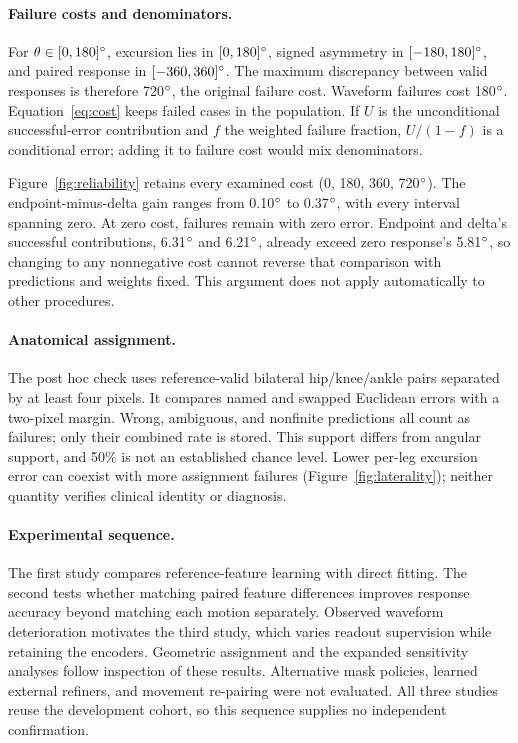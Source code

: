 \paragraph{Failure costs and denominators.} For $\theta\in[0,180]^{\circ}$, excursion lies in $[0,180]^{\circ}$, signed asymmetry in $[-180,180]^{\circ}$, and paired response in $[-360,360]^{\circ}$. The maximum discrepancy between valid responses is therefore 720$^{\circ}$, the original failure cost. Waveform failures cost 180$^{\circ}$. Equation~\ref{eq:cost} keeps failed cases in the population. If $U$ is the unconditional successful-error contribution and $f$ the weighted failure fraction, $U/(1-f)$ is a conditional error; adding it to failure cost would mix denominators.

Figure~\ref{fig:reliability} retains every examined cost (0, 180, 360, 720$^{\circ}$). The endpoint-minus-delta gain ranges from 0.10$^{\circ}$ to 0.37$^{\circ}$, with every interval spanning zero. At zero cost, failures remain with zero error. Endpoint and delta's successful contributions, 6.31$^{\circ}$ and 6.21$^{\circ}$, already exceed zero response's 5.81$^{\circ}$, so changing to any nonnegative cost cannot reverse that comparison with predictions and weights fixed. This argument does not apply automatically to other procedures.

\paragraph{Anatomical assignment.} The post hoc check uses reference-valid bilateral hip/knee/ankle pairs separated by at least four pixels. It compares named and swapped Euclidean errors with a two-pixel margin. Wrong, ambiguous, and nonfinite predictions all count as failures; only their combined rate is stored. This support differs from angular support, and 50\% is not an established chance level. Lower per-leg excursion error can coexist with more assignment failures (Figure~\ref{fig:laterality}); neither quantity verifies clinical identity or diagnosis.

\paragraph{Experimental sequence.} The first study compares reference-feature learning with direct fitting. The second tests whether matching paired feature differences improves response accuracy beyond matching each motion separately. Observed waveform deterioration motivates the third study, which varies readout supervision while retaining the encoders. Geometric assignment and the expanded sensitivity analyses follow inspection of these results. Alternative mask policies, learned external refiners, and movement re-pairing were not evaluated. All three studies reuse the development cohort, so this sequence supplies no independent confirmation.

